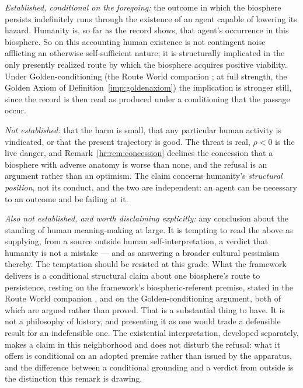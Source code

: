 \begin{remark}\label{hr:rem:notmistake}
\emph{Established, conditional on the foregoing:} the outcome in which
the biosphere persists indefinitely runs through the existence of an
agent capable of lowering its hazard. Humanity is, so far as the record
shows, that agent's occurrence in this biosphere. So on this accounting
human existence is not contingent noise afflicting an otherwise
self-sufficient nature; it is structurally implicated in the only
presently realized route by which the biosphere acquires positive
viability. Under Golden-conditioning
(the Route World companion \cite{GoldenRouteWorld}; at full strength, the
Golden Axiom of Definition~\ref{imp:goldenaxiom}) the implication is stronger still, since the record is
then read as produced under a conditioning that the passage occur.

\emph{Not established:} that the harm is small, that any particular
human activity is vindicated, or that the present trajectory is good.
The threat is real, $\rho<0$ is the live danger, and
Remark~\ref{hr:rem:concession} declines the concession that a biosphere
with adverse anatomy is worse than none, and the refusal is an argument
rather than an optimism. The claim concerns humanity's
\emph{structural position}, not its conduct, and the two are
independent: an agent can be necessary to an outcome and be failing at
it.

\emph{Also not established, and worth disclaiming explicitly:} any
conclusion about the standing of human meaning-making at large. It is
tempting to read the above as supplying, from a source outside human
self-interpretation, a verdict that humanity is not a mistake --- and as
answering a broader cultural pessimism thereby. The temptation should be
resisted at this grade. What the framework delivers is a conditional
structural claim about one biosphere's route to persistence, resting on
the framework's biospheric-referent premise, stated in the Route World companion \cite{GoldenRouteWorld}, and on the Golden-conditioning argument, both of which are
argued rather than proved. That is a substantial thing to have. It is
not a philosophy of history, and presenting it as one would trade a
defensible result for an indefensible one. The existential interpretation, developed separately, makes a
claim in this neighborhood and does not disturb the refusal: what it offers
is conditional on an adopted premise rather than issued by the
apparatus, and the difference between a conditional grounding and a verdict
from outside is the distinction this remark is drawing.
\end{remark}


